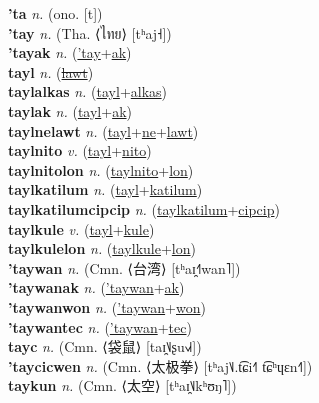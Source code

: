\textbf{'ta} \textit{n.} (ono. [t])
 \label{'ta} \\
\textbf{'tay} \textit{n.} (Tha. ⟨ไทย⟩ [tʰaj˧])
 \label{'tay} \\
\textbf{'tayak} \textit{n.} (\hyperref['tay]{'tay}+\hyperref[ak]{ak})
 \label{'tayak} \\
\textbf{tayl} \textit{n.} (\hyperref[lawt]{\sout{lawt}})
 \label{tayl} \\
\textbf{taylalkas} \textit{n.} (\hyperref[tayl]{tayl}+\hyperref[alkas]{alkas})
 \label{taylalkas} \\
\textbf{taylak} \textit{n.} (\hyperref[tayl]{tayl}+\hyperref[ak]{ak})
 \label{taylak} \\
\textbf{taylnelawt} \textit{n.} (\hyperref[tayl]{tayl}+\hyperref[ne]{ne}+\hyperref[lawt]{lawt})
 \label{taylnelawt} \\
\textbf{taylnito} \textit{v.} (\hyperref[tayl]{tayl}+\hyperref[nito]{nito})
 \label{taylnito} \\
\textbf{taylnitolon} \textit{n.} (\hyperref[taylnito]{taylnito}+\hyperref[lon]{lon})
 \label{taylnitolon} \\
\textbf{taylkatilum} \textit{n.} (\hyperref[tayl]{tayl}+\hyperref[katilum]{katilum})
 \label{taylkatilum} \\
\textbf{taylkatilumcipcip} \textit{n.} (\hyperref[taylkatilum]{taylkatilum}+\hyperref[cipcip]{cipcip})
 \label{taylkatilumcipcip} \\
\textbf{taylkule} \textit{v.} (\hyperref[tayl]{tayl}+\hyperref[kule]{kule})
 \label{taylkule} \\
\textbf{taylkulelon} \textit{n.} (\hyperref[taylkule]{taylkule}+\hyperref[lon]{lon})
 \label{taylkulelon} \\
\textbf{'taywan} \textit{n.} (Cmn. ⟨台湾⟩ [tʰaɪ̯˧˥wan˥])
 \label{'taywan} \\
\textbf{'taywanak} \textit{n.} (\hyperref['taywan]{'taywan}+\hyperref[ak]{ak})
 \label{'taywanak} \\
\textbf{'taywanwon} \textit{n.} (\hyperref['taywan]{'taywan}+\hyperref[won]{won})
 \label{'taywanwon} \\
\textbf{'taywantec} \textit{n.} (\hyperref['taywan]{'taywan}+\hyperref[tec]{tec})
 \label{'taywantec} \\
\textbf{tayc} \textit{n.} (Cmn. ⟨袋鼠⟩ [taɪ̯˥˩ʂu˧˩˧])
 \label{tayc} \\
\textbf{'taycicwen} \textit{n.} (Cmn. ⟨太极拳⟩ [tʰaj˥˩.t͡ɕi˧˥ t͡ɕʰɥɛn˧˥])
 \label{'taycicwen} \\
\textbf{taykun} \textit{n.} (Cmn. ⟨太空⟩ [tʰaɪ̯˥˩kʰʊŋ˥])
